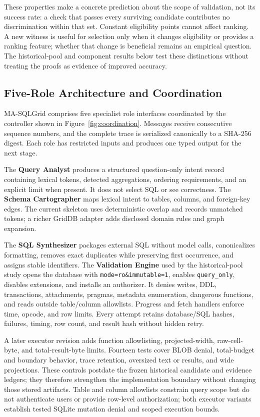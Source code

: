 \documentclass[information,article,submit,moreauthors]{Definitions/mdpi}
\newcommand{\masql}{MA-SQLGrid}
\begin{document}
These properties make a concrete prediction about the scope of validation, not its success rate: a check that passes every surviving candidate contributes no discrimination within that set. Constant eligibility points cannot affect ranking. A new witness is useful for selection only when it changes eligibility or provides a ranking feature; whether that change is beneficial remains an empirical question. The historical-pool and component results below test these distinctions without treating the proofs as evidence of improved accuracy.

\subsection{Five-Role Architecture and Coordination}

\masql{} comprises five specialist role interfaces coordinated by the controller shown in Figure~\ref{fig:coordination}. Messages receive consecutive sequence numbers, and the complete trace is serialized canonically to a SHA-256 digest. Each role has restricted inputs and produces one typed output for the next stage.

The \textbf{Query Analyst} produces a structured question-only intent record containing lexical tokens, detected aggregations, ordering requirements, and an explicit limit when present. It does not select SQL or see correctness. The \textbf{Schema Cartographer} maps lexical intent to tables, columns, and foreign-key edges. The current skeleton uses deterministic overlap and records unmatched tokens; a richer GridDB adapter adds disclosed domain rules and graph expansion.

The \textbf{SQL Synthesizer} packages external SQL without model calls, canonicalizes formatting, removes exact duplicates while preserving first occurrence, and assigns stable identifiers. The \textbf{Validation Engine} used by the historical-pool study opens the database with \texttt{mode=ro\&immutable=1}, enables \texttt{query\_only}, disables extensions, and installs an authorizer. It denies writes, DDL, transactions, attachments, pragmas, metadata enumeration, dangerous functions, and reads outside table/column allowlists. Progress and fetch handlers enforce time, opcode, and row limits. Every attempt retains database/SQL hashes, failures, timing, row count, and result hash without hidden retry.

A later executor revision adds function allowlisting, projected-width, raw-cell-byte, and total-result-byte limits. Fourteen tests cover BLOB denial, total-budget and boundary behavior, trace retention, oversized text or results, and wide projections. These controls postdate the frozen historical candidate and evidence ledgers; they therefore strengthen the implementation boundary without changing those stored artifacts. Table and column allowlists constrain query scope but do not authenticate users or provide row-level authorization; both executor variants establish tested SQLite mutation denial and scoped execution bounds.
\end{document}
